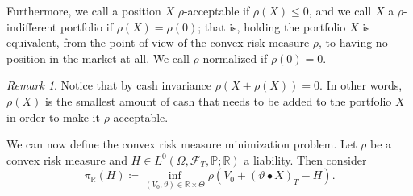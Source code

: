 \documentclass[11pt,a4paper,twoside,openany]{report}
\numberwithin{equation}{section}
\theoremstyle{plain} %
\theoremstyle{definition} %
\theoremstyle{remark} %
\newtheorem{remark}[theorem]{Remark}
\begin{document}
Furthermore, we call a position \(X\) \(\rho\)-acceptable if \(\rho(X)\leq 0\), and we call \(X\) a \(\rho\)-indifferent portfolio if \(\rho(X) = \rho(0)\); that is, holding the portfolio \(X\) is equivalent, from the point of view of the convex risk measure \(\rho\), to having no position in the market at all. We call \(\rho\) normalized if \(\rho(0)=0\).
\begin{remark}\label{rem:minimal amound of injected cash for acceptable position}
    Notice that by cash invariance \(\rho(X+\rho(X))=0\). In other words, \(\rho(X)\) is the smallest amount of cash that needs to be added to the portfolio \(X\) in order to make it \(\rho\)-acceptable.
\end{remark} 

We can now define the convex risk measure minimization problem. Let \(\rho\) be a convex risk measure and \(H\in  L^0(\Omega,\mathcal{F}_T,\mathbb{P};\mathbb{R})\) a liability. Then consider
\begin{equation}\label{eq:risk measure hedging}
    \pi_{\mathbb{R}}(H)\coloneqq\inf_{(V_0,\vartheta)\in\mathbb{R}\times \Theta}\rho\left(V_0+(\vartheta\bullet X)_T-H\right).
\end{equation}
\end{document}
